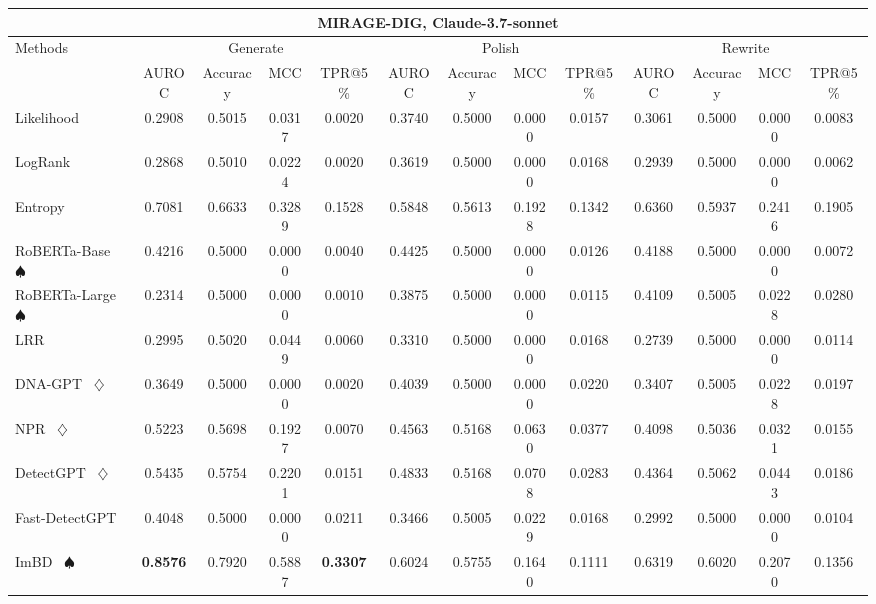 \begin{table*}[h]
{\begin{tabular}{l|cccc|cccc|cccc}
    \hline

    \hline
    \multicolumn{13}{c}{\textbf{MIRAGE-DIG, Claude-3.7-sonnet}}\\
    \hline

    \hline

    \hline
    \multirow{2}{*}{Methods}&\multicolumn{4}{c|}{Generate}&\multicolumn{4}{c|}{Polish}&\multicolumn{4}{c}{Rewrite} \\
    &  AUROC  &  Accuracy  &  MCC  &  TPR@5\%  &  AUROC  &  Accuracy  &  MCC  &  TPR@5\%  &  AUROC  &  Accuracy  &  MCC  &  TPR@5\%  \\
    \hline

    \hline
    Likelihood~\cite{likelihood} & 0.2908 & 0.5015 & 0.0317 & 0.0020 & 0.3740 & 0.5000 & 0.0000 & 0.0157 & 0.3061 & 0.5000 & 0.0000 & 0.0083 \\
    LogRank~\cite{logrank} & 0.2868 & 0.5010 & 0.0224 & 0.0020 & 0.3619 & 0.5000 & 0.0000 & 0.0168 & 0.2939 & 0.5000 & 0.0000 & 0.0062 \\
    Entropy~\cite{entropy} & 0.7081 & 0.6633 & 0.3289 & 0.1528 & 0.5848 & 0.5613 & 0.1928 & 0.1342 & 0.6360 & 0.5937 & 0.2416 & 0.1905 \\
    RoBERTa-Base~\cite{roberta} $\spadesuit$ & 0.4216 & 0.5000 & 0.0000 & 0.0040 & 0.4425 & 0.5000 & 0.0000 & 0.0126 & 0.4188 & 0.5000 & 0.0000 & 0.0072 \\
    RoBERTa-Large~\cite{roberta} $\spadesuit$ & 0.2314 & 0.5000 & 0.0000 & 0.0010 & 0.3875 & 0.5000 & 0.0000 & 0.0115 & 0.4109 & 0.5005 & 0.0228 & 0.0280 \\
    LRR~\cite{lrrandnpr} & 0.2995 & 0.5020 & 0.0449 & 0.0060 & 0.3310 & 0.5000 & 0.0000 & 0.0168 & 0.2739 & 0.5000 & 0.0000 & 0.0114 \\
    DNA-GPT~\cite{dna-gpt} $\diamondsuit$ & 0.3649 & 0.5000 & 0.0000 & 0.0020 & 0.4039 & 0.5000 & 0.0000 & 0.0220 & 0.3407 & 0.5005 & 0.0228 & 0.0197 \\
    NPR~\cite{lrrandnpr} $\diamondsuit$ & 0.5223 & 0.5698 & 0.1927 & 0.0070 & 0.4563 & 0.5168 & 0.0630 & 0.0377 & 0.4098 & 0.5036 & 0.0321 & 0.0155 \\
    DetectGPT~\cite{detectgpt} $\diamondsuit$ & 0.5435 & 0.5754 & 0.2201 & 0.0151 & 0.4833 & 0.5168 & 0.0708 & 0.0283 & 0.4364 & 0.5062 & 0.0443 & 0.0186 \\
    Fast-DetectGPT~\cite{fastdetectgpt} & 0.4048 & 0.5000 & 0.0000 & 0.0211 & 0.3466 & 0.5005 & 0.0229 & 0.0168 & 0.2992 & 0.5000 & 0.0000 & 0.0104 \\
    ImBD~\cite{imbd} $\spadesuit$ & \textbf{0.8576} & 0.7920 & 0.5887 & \textbf{0.3307} & 0.6024 & 0.5755 & 0.1640 & 0.1111 & 0.6319 & 0.6020 & 0.2070 & 0.1356 \\
    \hline
    

\end{tabular}}
\end{table*}
